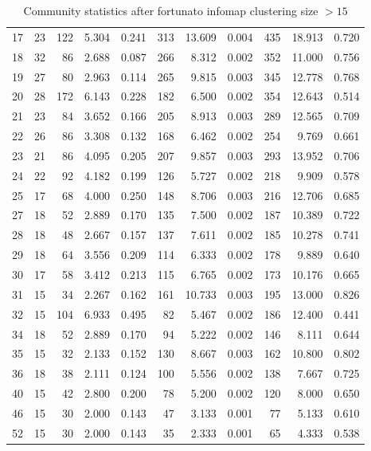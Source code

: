\begin{table}[ht]
\begin{adjustbox}{max width=\textwidth}
\begin{tabular}{lrrrrrrrrrr}
  17 & 23 & 122 & 5.304 & 0.241 & 313 & 13.609 & 0.004 & 435 & 18.913 & 0.720 \\ 
  18 & 32 & 86 & 2.688 & 0.087 & 266 & 8.312 & 0.002 & 352 & 11.000 & 0.756 \\ 
  19 & 27 & 80 & 2.963 & 0.114 & 265 & 9.815 & 0.003 & 345 & 12.778 & 0.768 \\ 
  20 & 28 & 172 & 6.143 & 0.228 & 182 & 6.500 & 0.002 & 354 & 12.643 & 0.514 \\ 
  21 & 23 & 84 & 3.652 & 0.166 & 205 & 8.913 & 0.003 & 289 & 12.565 & 0.709 \\ 
  22 & 26 & 86 & 3.308 & 0.132 & 168 & 6.462 & 0.002 & 254 & 9.769 & 0.661 \\ 
  23 & 21 & 86 & 4.095 & 0.205 & 207 & 9.857 & 0.003 & 293 & 13.952 & 0.706 \\ 
  24 & 22 & 92 & 4.182 & 0.199 & 126 & 5.727 & 0.002 & 218 & 9.909 & 0.578 \\ 
  25 & 17 & 68 & 4.000 & 0.250 & 148 & 8.706 & 0.003 & 216 & 12.706 & 0.685 \\ 
  27 & 18 & 52 & 2.889 & 0.170 & 135 & 7.500 & 0.002 & 187 & 10.389 & 0.722 \\ 
  28 & 18 & 48 & 2.667 & 0.157 & 137 & 7.611 & 0.002 & 185 & 10.278 & 0.741 \\ 
  29 & 18 & 64 & 3.556 & 0.209 & 114 & 6.333 & 0.002 & 178 & 9.889 & 0.640 \\ 
  30 & 17 & 58 & 3.412 & 0.213 & 115 & 6.765 & 0.002 & 173 & 10.176 & 0.665 \\ 
  31 & 15 & 34 & 2.267 & 0.162 & 161 & 10.733 & 0.003 & 195 & 13.000 & 0.826 \\ 
  32 & 15 & 104 & 6.933 & 0.495 & 82 & 5.467 & 0.002 & 186 & 12.400 & 0.441 \\ 
  34 & 18 & 52 & 2.889 & 0.170 & 94 & 5.222 & 0.002 & 146 & 8.111 & 0.644 \\ 
   35 & 15 & 32 & 2.133 & 0.152 & 130 & 8.667 & 0.003 & 162 & 10.800 & 0.802 \\ 
  36 & 18 & 38 & 2.111 & 0.124 & 100 & 5.556 & 0.002 & 138 & 7.667 & 0.725 \\ 
  40 & 15 & 42 & 2.800 & 0.200 & 78 & 5.200 & 0.002 & 120 & 8.000 & 0.650 \\ 
  46 & 15 & 30 & 2.000 & 0.143 & 47 & 3.133 & 0.001 & 77 & 5.133 & 0.610 \\ 
  52 & 15 & 30 & 2.000 & 0.143 & 35 & 2.333 & 0.001 & 65 & 4.333 & 0.538 \\ 
   \bottomrule
\end{tabular}
\end{adjustbox}
\caption{Community statistics after fortunato infomap clustering size $> 15$} 
\label{tab:Community statistics after fortunato infomap clustering size > 15}
\end{table}

